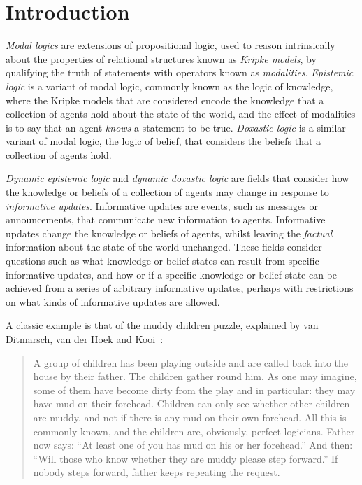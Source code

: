 \chapter{Introduction}


{\em Modal logics} are extensions of propositional logic, used to reason
intrinsically about the properties of relational structures known as {\em
Kripke models}, by qualifying the truth of statements with operators known as
{\em modalities}. {\em Epistemic logic} is a variant of modal logic, commonly
known as the logic of knowledge, where the Kripke models that are considered
encode the knowledge that a collection of agents hold about the state of the
world, and the effect of modalities is to say that an agent {\em knows} a
statement to be true. {\em Doxastic logic} is a similar variant of modal logic,
the logic of belief, that considers the beliefs that a collection of agents
hold.

{\em Dynamic epistemic logic} and {\em dynamic doxastic logic} are fields that
consider how the knowledge or beliefs of a collection of agents may change in
response to {\em informative updates}. Informative updates are events, such as
messages or announcements, that communicate new information to agents. 
Informative updates change the knowledge or beliefs of agents, whilst leaving
the {\em factual} information about the state of the world unchanged.  These
fields consider questions such as what knowledge or belief states can result
from specific informative updates, and how or if a specific knowledge or belief
state can be achieved from a series of arbitrary informative updates, perhaps
with restrictions on what kinds of informative updates are allowed.

A classic example is that of the muddy children puzzle, explained by van
Ditmarsch, van der Hoek and Kooi~\cite{vanditmarsch2007dynamic}:

\begin{quote}
A group of children has been playing outside and are called back into the house
by their father. The children gather round him. As one may imagine, some of them
have become dirty from the play and in particular: they may have mud on their
forehead. Children can only see whether other children are muddy, and not if
there is any mud on their own forehead. All this is commonly known, and the
children are, obviously, perfect logicians. Father now says: “At least one of
you has mud on his or her forehead.” And then: “Will those who know whether they
are muddy please step forward.” If nobody steps forward, father keeps repeating
the request.
\end{quote}

